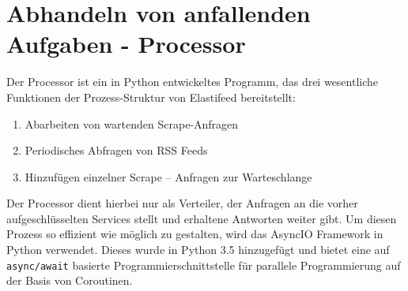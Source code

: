 \section{Abhandeln von anfallenden Aufgaben - Processor}
Der Processor ist ein in Python entwickeltes Programm, das drei wesentliche Funktionen der Prozess-Struktur von Elastifeed bereitstellt:
\begin{enumerate}
        \item Abarbeiten von wartenden Scrape-Anfragen
        \item Periodisches Abfragen von RSS Feeds
        \item Hinzufügen einzelner Scrape – Anfragen zur Warteschlange
\end{enumerate}
Der Processor dient hierbei nur als Verteiler, der Anfragen an die vorher aufgeschlüsselten Services stellt und erhaltene Antworten weiter gibt.
Um diesen Prozess so effizient wie möglich zu gestalten, wird das AsyncIO Framework in Python \cite{aiopy} verwendet.
Dieses wurde in Python 3.5 hinzugefügt und bietet eine auf \texttt{async/await} basierte Programmierschnittstelle für parallele Programmierung auf der Basis von Coroutinen.

